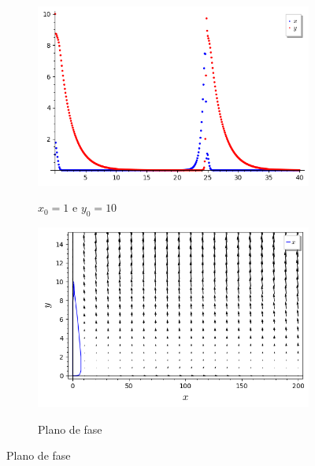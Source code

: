 \begin{figure}[H]
    \centering
    \begin{subfigure}{0.4\textwidth}
        \includegraphics[scale=0.48]{figuras/RM-citros (1,10) plot.png}
        \label{fig:RM-citros_3}
        \caption{$x_0 = 1$ e $y_0 = 10$}
    \end{subfigure}
    \begin{subfigure}{0.4\textwidth}
        \includegraphics[scale=0.48]{figuras/RM-citros (1,10) plano.png}
        \label{fig:RM-citros_4}
        \caption{Plano de fase}
    \end{subfigure}
\end{figure}

